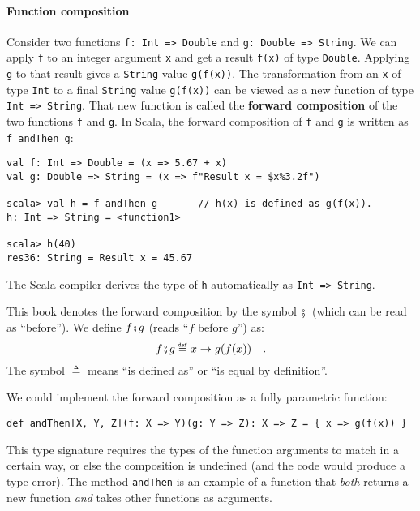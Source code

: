 \paragraph{Function composition}

Consider two functions \lstinline!f: Int => Double!
and \lstinline!g: Double => String!. We can apply \lstinline!f!
to an integer argument \lstinline!x! and get a result \lstinline!f(x)!
of type \lstinline!Double!. Applying \lstinline!g! to that result
gives a \lstinline!String! value \lstinline!g(f(x))!. The transformation
from an \lstinline!x! of type \lstinline!Int! to a final \lstinline!String!
value \lstinline!g(f(x))! can be viewed as a new function of type
\lstinline!Int => String!. That new function is called the \textbf{forward
composition} of the two functions \lstinline!f!
and \lstinline!g!. In Scala, the forward composition of \lstinline!f!
and \lstinline!g! is written as \lstinline!f andThen g!:
\begin{lstlisting}
val f: Int => Double = (x => 5.67 + x)
val g: Double => String = (x => f"Result x = $x%3.2f")

scala> val h = f andThen g       // h(x) is defined as g(f(x)).
h: Int => String = <function1>

scala> h(40)
res36: String = Result x = 45.67
\end{lstlisting}
The Scala compiler derives the type of \lstinline!h! automatically
as \lstinline!Int => String!.

This book denotes the forward composition by the symbol ${\displaystyle \bef}$
(which can be read as \textsf{``}before\textsf{''}). We define $f\bef g$ (reads \textsf{``}$f$
before $g$\textsf{''}) as:
\begin{equation}
f\bef g\triangleq x\rightarrow g(f(x))\quad.\label{eq:def-of-forward-composition}
\end{equation}
The symbol $\triangleq$ means \textsf{``}is defined as\textsf{''} or \textsf{``}is equal
by definition\textsf{''}.

We could implement the forward composition as a fully parametric function:
\begin{lstlisting}
def andThen[X, Y, Z](f: X => Y)(g: Y => Z): X => Z = { x => g(f(x)) }
\end{lstlisting}
This type signature requires the types of the function arguments to
match in a certain way, or else the composition is undefined (and
the code would produce a type error). The method \lstinline!andThen!
is an example of a function that \emph{both} returns a new function
\emph{and} takes other functions as arguments.

